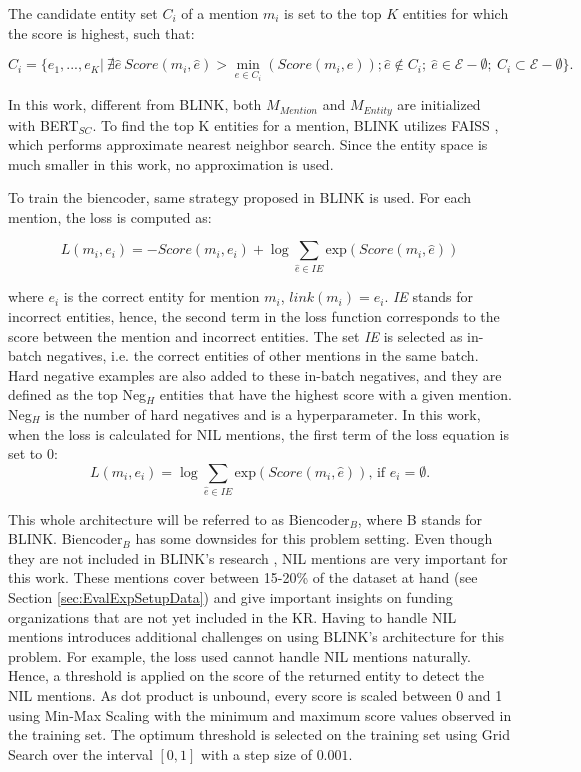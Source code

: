 \documentclass{report}
\theoremstyle{definition}
\theoremstyle{remark}
\begin{document}
The candidate entity set $C_i$ of a mention $m_i$ is set to the top $K$ entities for which the score is highest, such that:

\begin{equation}
    C_i = \{e_1,...,e_K | \ \nexists\hat{e} \ Score(m_i,\hat{e}) > \min_{e\in C_i}(Score(m_i, e )); \hat{e} \notin C_i; \ \hat{e} \in \mathcal{E}-\emptyset; \ C_i \subset \mathcal{E}-\emptyset  \}.
\end{equation}

In this work, different from BLINK, both $M_{Mention}$ and $M_{Entity}$ are initialized with BERT$_{SC}$. To find the top K entities for a mention, BLINK utilizes FAISS \cite{faiss}, which performs approximate nearest neighbor search. Since the entity space is much smaller in this work, no approximation is used. 

To train the biencoder, same strategy proposed in BLINK is used. For each mention, the loss is computed as:

\begin{equation}
    L(m_i,e_i) = -Score(m_i,e_i) + \log \sum_{\hat{e} \in IE} \text{exp}( Score(m_i,\hat{e}))
\end{equation}

\noindent where $e_i$ is the correct entity for mention $m_i$, $link(m_i)=e_i$. \textit{IE} stands for incorrect entities, hence, the second term in the loss function corresponds to the score between the mention and incorrect entities. The set \textit{IE} is selected as in-batch negatives, i.e. the correct entities of other mentions in the same batch. Hard negative examples are also added to these in-batch negatives, and they are defined as the top Neg$_H$ entities that have the highest score with a given mention. Neg$_H$ is the number of hard negatives and is a hyperparameter. In this work, when the loss is calculated for NIL mentions, the first term of the loss equation is set to 0:
\begin{equation}
    L(m_i,e_i) = \log \sum_{\hat{e} \in IE} \text{exp}( Score(m_i,\hat{e})) \text{, if } e_i = \emptyset.
\end{equation}

This whole architecture will be referred to as Biencoder$_{B}$, where B stands for BLINK. Biencoder$_{B}$ has some downsides for this problem setting. Even though they are not included in BLINK's research \cite{scalablezeroshot}, NIL mentions are very important for this work. These mentions cover between 15-20\% of the dataset at hand (see Section \ref{sec:EvalExpSetupData}) and give important insights on funding organizations that are not yet included in the KR. Having to handle NIL mentions introduces additional challenges on using BLINK's architecture for this problem. For example, the loss used cannot handle NIL mentions naturally. Hence, a threshold is applied on the score of the returned entity to detect the NIL mentions. As dot product is unbound, every score is scaled between 0 and 1 using Min-Max Scaling with the minimum and maximum score values observed in the training set. The optimum threshold is selected on the training set using Grid Search over the interval $[0,1]$ with a step size of $0.001$.
\end{document}
